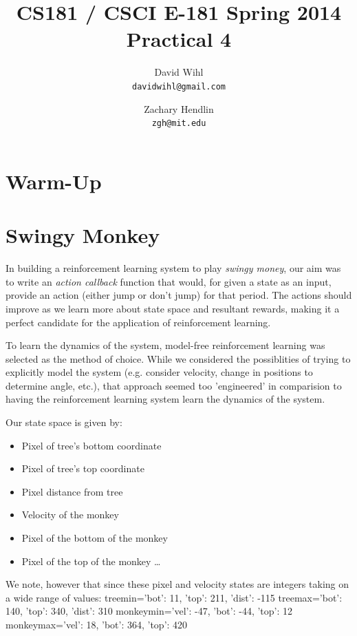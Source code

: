 \documentclass[11pt, oneside]{article}   	%
\title{CS181 / CSCI E-181 Spring 2014 Practical 4}
\author{
  David Wihl\\
  \texttt{davidwihl@gmail.com}
  \and
  Zachary Hendlin\\
  \texttt{zgh@mit.edu} 
}
\begin{document}
\maketitle
\section*{Warm-Up}


\section*{Swingy Monkey}
In building a reinforcement learning system to play \textit{swingy money}, our aim was to write an \textit{action callback} function that would, for given a state as an input, provide an action (either jump or don't jump) for that period. The actions should improve as we learn more about state space and resultant rewards, making it a perfect candidate for the application of reinforcement learning.
\newline 

To learn the dynamics of the system, model-free reinforcement learning was selected as the method of choice. While we considered the possiblities of trying to explicitly model the system (e.g. consider velocity, change in positions to determine angle, etc.), that approach seemed too 'engineered' in comparision to having the reinforcement learning system learn the dynamics of the system.
\newline 

Our state space is given by:

\begin{itemize}

  \item Pixel of tree's bottom coordinate
  \item Pixel of tree's top coordinate
  \item Pixel distance from tree
  \item Velocity of the monkey
  \item Pixel of the bottom of the monkey
  \item Pixel of the top of the monkey \ldots

\end{itemize}

We note, however that since these pixel and velocity states are integers taking on a wide range of values:
\newline
treemin={'bot': 11, 'top': 211, 'dist': -115}
\newline
treemax={'bot': 140, 'top': 340, 'dist': 310}
\newline
monkeymin={'vel': -47, 'bot': -44, 'top': 12}
\newline
monkeymax={'vel': 18, 'bot': 364, 'top': 420}
\newline 
\end{document}
